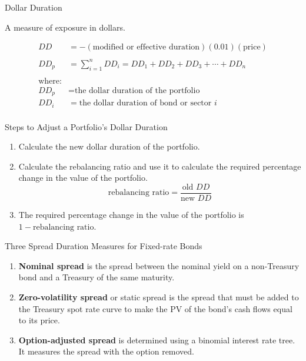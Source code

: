 \documentclass[../custom]{flashcards}
\begin{document}
\begin{flashcard}{Dollar Duration}
    \begin{flushleft}
        A measure of exposure in dollars.
    \end{flushleft}
    \begin{align*}
        DD &= -(\text{modified or effective duration})(0.01)(\text{price})\\
        \\
        DD_p &= \sum_{i=1}^n DD_i = DD_1 + DD_2 + DD_3 + \cdots + DD_n\\
        \\
        \text{where:}\\
        DD_p &= \text{the dollar duration of the portfolio}\\
        DD_i &= \text{the dollar duration of bond or sector $i$}\\
    \end{align*}
\end{flashcard}

\begin{flashcard}{Steps to Adjust a Portfolio's Dollar Duration}
    \begin{enumerate}
        \item Calculate the new dollar duration of the portfolio.
        \item Calculate the rebalancing ratio and use it to calculate the required percentage change in the value of the portfolio.
        \[
            \text{rebalancing ratio} = \frac{\text{old $DD$}}{\text{new $DD$}}
        \]
        \item The required percentage change in the value of the portfolio is $1 - \text{rebalancing ratio}$.
    \end{enumerate}
\end{flashcard}

\begin{flashcard}{Three Spread Duration Measures for Fixed-rate Bonds}
    \begin{enumerate}
        \item \textbf{Nominal spread} is the spread between the nominal yield on a non-Treasury bond and a Treasury of the same maturity.
        \item \textbf{Zero-volatility spread} or static spread is the spread that must be added to the Treasury spot rate curve to make the PV of the bond's cash flows equal to its price.
        \item \textbf{Option-adjusted spread} is determined using a binomial interest rate tree. It measures the spread with the option removed.
    \end{enumerate}
\end{flashcard}
\end{document}
